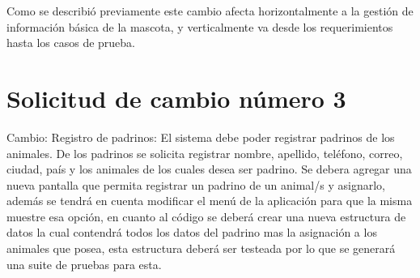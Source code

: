 Como se describió previamente este cambio afecta horizontalmente a la gestión de información básica de la mascota, y verticalmente va desde los requerimientos hasta los casos de prueba.

\section{Solicitud de cambio número 3}
Cambio: Registro de padrinos: El sistema debe poder registrar padrinos de los animales. De los padrinos se solicita registrar nombre, apellido, teléfono, correo, ciudad, país y los animales de los cuales desea ser padrino.
Se debera agregar una nueva pantalla que permita registrar un padrino de un animal/s y asignarlo, además se tendrá en cuenta modificar el menú de la aplicación para que la misma muestre esa opción, en cuanto al código se deberá crear una nueva estructura de datos la cual contendrá todos los datos del padrino mas la asignación a los animales que posea, esta estructura deberá ser testeada por lo que se generará una suite de pruebas para esta.


